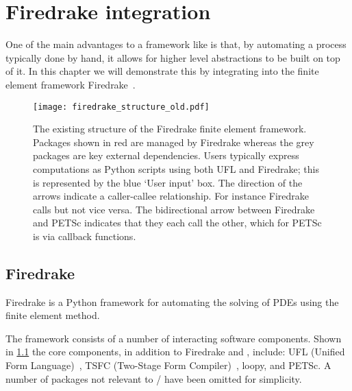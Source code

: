 \documentclass[thesis]{subfiles}
\begin{document}
\chapter{Firedrake integration}
\label{chapter:firedrake}

One of the main advantages to a framework like  is that, by automating a process typically done by hand, it allows for higher level abstractions to be built on top of it.
In this chapter we will demonstrate this by integrating  into the finite element framework Firedrake~\cite{FiredrakeUserManual}.

\begin{figure}
  \texttt{[image: firedrake\_structure\_old.pdf]}
  \caption{
    The existing structure of the Firedrake finite element framework.
    Packages shown in red are managed by Firedrake whereas the grey packages are key external dependencies.
    Users typically express computations as Python scripts using both UFL and Firedrake; this is represented by the blue `User input' box.
    The direction of the arrows indicate a caller-callee relationship.
    For instance Firedrake calls  but not vice versa.
    The bidirectional arrow between Firedrake and PETSc indicates that they each call the other, which for PETSc is via callback functions.
  }
  \label{fig:firedrake_structure_old}
\end{figure}

\section{Firedrake}

Firedrake is a Python framework for automating the solving of PDEs using the finite element method.

The framework consists of a number of interacting software components.
Shown in \cref{fig:firedrake_structure_old} the core components, in addition to Firedrake and , include: UFL (Unified Form Language)~\cite{alnaesUnifiedFormLanguage2014a}, TSFC (Two-Stage Form Compiler)~\cite{homolyaTSFCStructurePreservingForm2018}, loopy, and PETSc.
A number of packages not relevant to / have been omitted for simplicity.
\end{document}
